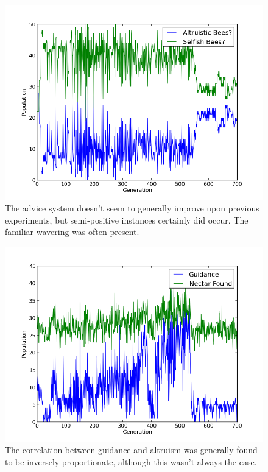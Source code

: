 \documentclass[11pt, letter]{article}
\begin{document}
                        \begin{figure}[tbph!]
				\begin{center}
					\includegraphics[scale=.5]{results/gossip_plot_twist_comp.png}
				\end{center}
				\caption{The advice system doesn't seem to generally improve upon previous experiments, but semi-positive instances certainly did occur. The familiar wavering was often present.}
				\label{fig:gossip_composition}
			\end{figure}

			\begin{figure}[tbph!]
				\begin{center}
					\includegraphics[scale=.5]{results/gossip_plot_twist_tell.png}
				\end{center}
                \caption{The correlation between guidance and altruism was generally found to be inversely proportionate, although this wasn't always the case.}
				\label{fig:gossip_guidance}
			\end{figure}
\end{document}
